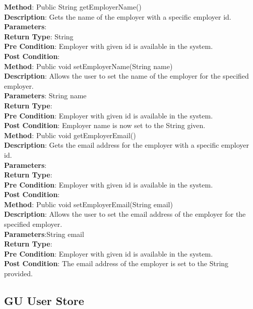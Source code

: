 \documentclass{l3deliverable}
\begin{document}
\textbf{Method}: Public String getEmployerName()\\
\textbf{Description}: Gets the name of the employer with a specific employer id.\\
\textbf{Parameters}:\\
\textbf{Return Type}: String\\
\textbf{Pre Condition}: Employer with given id is available in the system.\\
\textbf{Post Condition}:\\

\textbf{Method}: Public void setEmployerName(String name)\\
\textbf{Description}: Allows the user to set the name of the employer for the specified employer.\\
\textbf{Parameters}: String name\\
\textbf{Return Type}:\\
\textbf{Pre Condition}: Employer with given id is available in the system.\\
\textbf{Post Condition}: Employer name is now set to the String given.\\

\textbf{Method}: Public void getEmployerEmail()\\
\textbf{Description}: Gets the email address for the employer with a specific employer id.\\
\textbf{Parameters}:\\
\textbf{Return Type}:\\
\textbf{Pre Condition}: Employer with given id is available in the system.\\
\textbf{Post Condition}:\\

\textbf{Method}: Public void setEmployerEmail(String email)\\
\textbf{Description}: Allows the user to set the email address of the employer for the specified employer.\\
\textbf{Parameters}:String email\\
\textbf{Return Type}:\\
\textbf{Pre Condition}: Employer with given id is available in the system.\\
\textbf{Post Condition}: The email address of the employer is set to the String provided.\\

\subsection{GU User Store}
\end{document}
